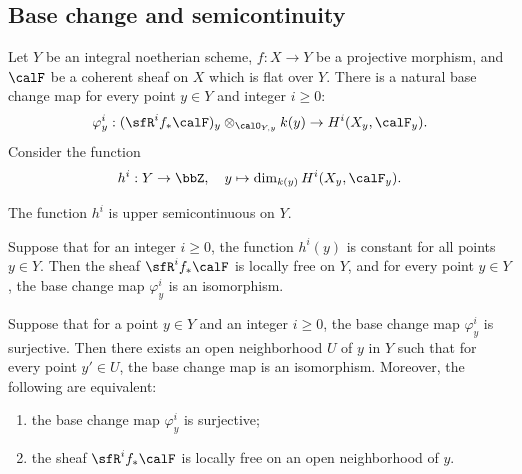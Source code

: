 

\subsection{Base change and semicontinuity}


    Let \(Y\) be an integral noetherian scheme, \(f:X\to Y\) be a projective morphism, and \(\calF\) be a coherent sheaf on \(X\) which is flat over \(Y\). 
    There is a natural base change map for every point \(y \in Y\) and integer \(i \geq 0\):
    \[
        \varphi^i_y:(\sfR^i f_* \calF)_y \otimes_{\calO_{Y,y}} k(y) \to H^i(X_y,\calF_y).
    \]
    Consider the function 
    \[
        h^i:Y\to \bbZ, \quad y\mapsto \dim_{k(y)} H^i(X_y,\calF_y).
    \]

    \begin{theorem}\label{thm:semicontinuity_of_cohomology}
        The function \(h^i\) is upper semicontinuous on \(Y\).
    \end{theorem}


    \begin{theorem}\label{thm:Grauert_theorem}
        Suppose that for an integer \(i\geq 0\), the function \(h^i(y)\) is constant for all points \(y \in Y\).
        Then the sheaf \(\sfR^i f_* \calF\) is locally free on \(Y\), 
        and for every point \(y \in Y\), the base change map \(\varphi^i_y\) is an isomorphism.
    \end{theorem}

    \begin{theorem}\label{thm:cohomology_and_base_change}
        Suppose that for a point \(y \in Y\) and an integer \(i \geq 0\), the base change map \(\varphi^i_y\) is surjective.
        Then there exists an open neighborhood \(U\) of \(y\) in \(Y\) such that for every point \(y' \in U\), the base change map is an isomorphism. 
        Moreover, the following are equivalent:
        \begin{enumerate}
            \item the base change map \(\varphi^i_y\) is surjective;
            \item the sheaf \(\sfR^i f_* \calF\) is locally free on an open neighborhood of \(y\).
        \end{enumerate}
    \end{theorem}


